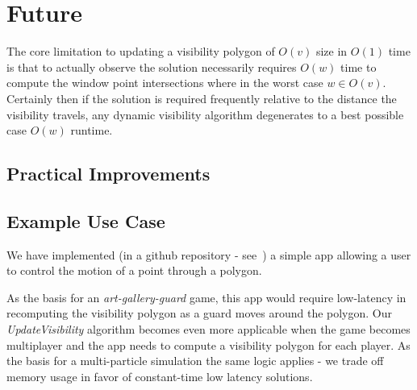 \section{Future} \label{sec:future}

The core limitation to updating a visibility polygon of $O(v)$ size in
$O(1)$ time is that to actually observe the solution necessarily
requires $O(w)$ time to compute the window point intersections where
in the worst case $w \in O(v)$. Certainly then if the solution is
required frequently relative to the distance the visibility travels,
any dynamic visibility algorithm degenerates to a best possible case
$O(w)$ runtime.

\subsection{Practical Improvements} \label{sec:improvements}

\subsection{Example Use Case} \label{sec:use-cases}

We have implemented (in a github repository - see~\cite{visibility-github})
a simple app allowing a user to control the motion of a point through a
polygon.

As the basis for an \emph{art-gallery-guard} game, this app would
require low-latency in recomputing the visibility polygon as a guard
moves around the polygon. Our \emph{UpdateVisibility} algorithm becomes
even more applicable when the game becomes multiplayer and the app needs
to compute a visibility polygon for each player.
As the basis for a multi-particle simulation the same logic applies -
we trade off memory usage in favor of constant-time low latency solutions.

